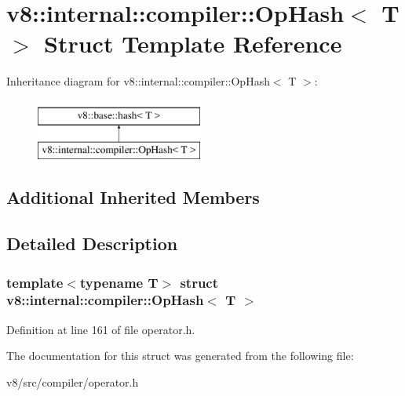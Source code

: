 \hypertarget{structv8_1_1internal_1_1compiler_1_1OpHash}{}\section{v8\+:\+:internal\+:\+:compiler\+:\+:Op\+Hash$<$ T $>$ Struct Template Reference}
\label{structv8_1_1internal_1_1compiler_1_1OpHash}
Inheritance diagram for v8\+:\+:internal\+:\+:compiler\+:\+:Op\+Hash$<$ T $>$\+:\begin{figure}[H]
\begin{center}
\leavevmode
\includegraphics[height=2.000000cm]{structv8_1_1internal_1_1compiler_1_1OpHash}
\end{center}
\end{figure}
\subsection*{Additional Inherited Members}


\subsection{Detailed Description}
\subsubsection*{template$<$typename T$>$\newline
struct v8\+::internal\+::compiler\+::\+Op\+Hash$<$ T $>$}



Definition at line 161 of file operator.\+h.



The documentation for this struct was generated from the following file\+:\begin{DoxyCompactItemize}
\item 
v8/src/compiler/operator.\+h\end{DoxyCompactItemize}
